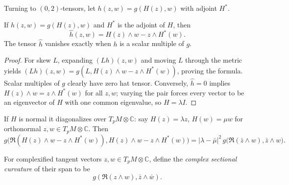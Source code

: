 Turning to $(0,2)$-tensors, let $h(z,w)=g(H(z),w)$ with adjoint $H^*$.

\begin{proposition}
  \label{prop:pet-ch9-02tensor-hat-formula}
  If $h(z,w)=g(H(z),w)$ and $H^*$ is the adjoint of $H$, then
  \[
    \hat h(z,w)=H(z)\wedge w-z\wedge H^*(w).
  \]
  The tensor $\hat h$ vanishes exactly when $h$ is a scalar multiple of $g$.
\end{proposition}
\begin{proof}
  \sketch
  For skew \(L\), expanding \((Lh)(z,w)\) and moving \(L\) through the metric
  yields
  \((Lh)(z,w)=g(L,H(z)\wedge w-z\wedge H^*(w))\), proving the formula.
  Scalar multiples of \(g\) clearly have zero hat tensor.  Conversely,
  \(\hat h=0\) implies
  \(H(z)\wedge w=z\wedge H^*(w)\) for all \(z,w\); varying the pair forces
  every vector to be an eigenvector of \(H\) with one common eigenvalue, so
  \(H=\lambda I\).
\end{proof}

If $H$ is normal it diagonalizes over $T_pM\otimes\mathbb{C}$: say $H(z)=\lambda z$,
$H(w)=\mu w$ for orthonormal $z,w\in T_pM\otimes\mathbb{C}$. Then
\[
  g\big(\mathfrak{R}(H(z)\wedge w-z\wedge H^*(w)),H(z)\wedge w-z\wedge H^*(w)\big)
  =|\lambda-\bar\mu|^2\,g\big(\mathfrak{R}(\bar z\wedge w),\bar z\wedge w\big).
\]

\begin{definition}
  \label{def:pet-ch9-complex-sectional-curvature}
  For complexified tangent vectors $z,w\in T_pM\otimes\mathbb C$, define the
  \emph{complex sectional curvature} of their span to be
  \[
    g(\mathfrak R(z\wedge w),\bar z\wedge\bar w).
  \]
\end{definition}

